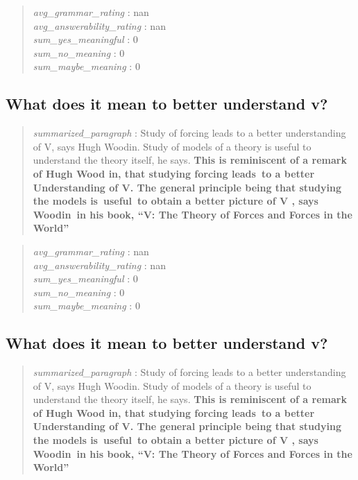 \begin{quote}
\emph{avg\_grammar\_rating} : nan\\
\emph{avg\_answerability\_rating} : nan\\
\emph{sum\_yes\_meaningful} : 0\\
\emph{sum\_no\_meaning} : 0\\
\emph{sum\_maybe\_meaning} : 0
\end{quote}

\hypertarget{what-does-it-mean-to-better-understand-v}{%
\subsection{What does it mean to better understand
v?}\label{what-does-it-mean-to-better-understand-v}}

\begin{quote}
\emph{summarized\_paragraph} : Study of forcing leads to a better
understanding of V, says Hugh Woodin. Study of models of a theory is
useful to understand the theory itself, he says. \textbf{This is
reminiscent of a remark of Hugh Wood in, that studying forcing leads~to
a better Understanding of V. The general principle being that studying
the models is~useful~to obtain a better picture of V , says Woodin~in
his book, ``V: The Theory of Forces and Forces in the World''}
\end{quote}

\begin{quote}
\emph{avg\_grammar\_rating} : nan\\
\emph{avg\_answerability\_rating} : nan\\
\emph{sum\_yes\_meaningful} : 0\\
\emph{sum\_no\_meaning} : 0\\
\emph{sum\_maybe\_meaning} : 0
\end{quote}

\hypertarget{what-does-it-mean-to-better-understand-v-1}{%
\subsection{What does it mean to better understand
v?}\label{what-does-it-mean-to-better-understand-v-1}}

\begin{quote}
\emph{summarized\_paragraph} : Study of forcing leads to a better
understanding of V, says Hugh Woodin. Study of models of a theory is
useful to understand the theory itself, he says. \textbf{This is
reminiscent of a remark of Hugh Wood in, that studying forcing leads~to
a better Understanding of V. The general principle being that studying
the models is~useful~to obtain a better picture of V , says Woodin~in
his book, ``V: The Theory of Forces and Forces in the World''}
\end{quote}


